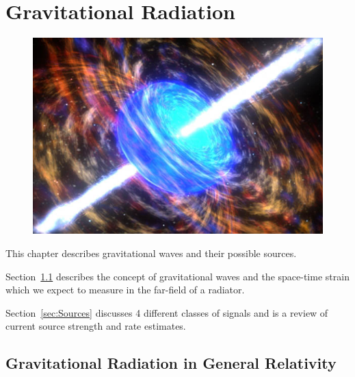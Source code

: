 
%

\chapter{Gravitational Radiation}
\label{chap:GW}

\begin{figure}[!h]
\centerline{\includegraphics[angle=0,width=6.5in]{Figures/Chap1/GRB-DestroyStar.jpg}}
\end{figure}
\clearpage

This chapter describes gravitational waves and their possible sources.

Section~\ref{sec:GR} describes the concept of gravitational waves and the space-time
strain which we expect to measure in the far-field of a radiator.

Section~\ref{sec:Sources} discusses 4 different classes of signals and is a review
of current source strength and rate estimates.



\section{Gravitational Radiation in General Relativity}
\label{sec:GR}


